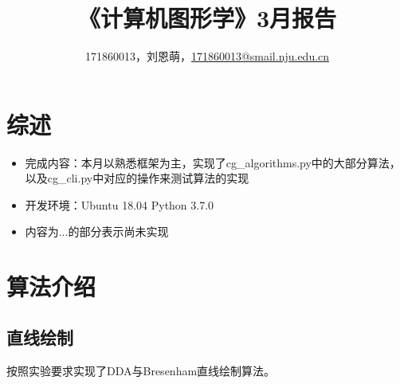 \documentclass[a4paper,UTF8]{article}
\theoremstyle{definition}
\begin{document}
\title{\textbf{《计算机图形学》3月报告}}
\author{171860013，刘恩萌，\href{171860013@smail.nju.edu.cn}{171860013@smail.nju.edu.cn}}
\maketitle

\section{综述}
\begin{itemize}
  \item 完成内容：本月以熟悉框架为主，实现了cg\_algorithms.py中的大部分算法，以及cg\_cli.py中对应的操作来测试算法的实现
  \item 开发环境：Ubuntu 18.04 Python 3.7.0
  \item 内容为$\dots$的部分表示尚未实现
\end{itemize}


\section{算法介绍}
\subsection{直线绘制}
按照实验要求实现了DDA与Bresenham直线绘制算法。
\end{document}
